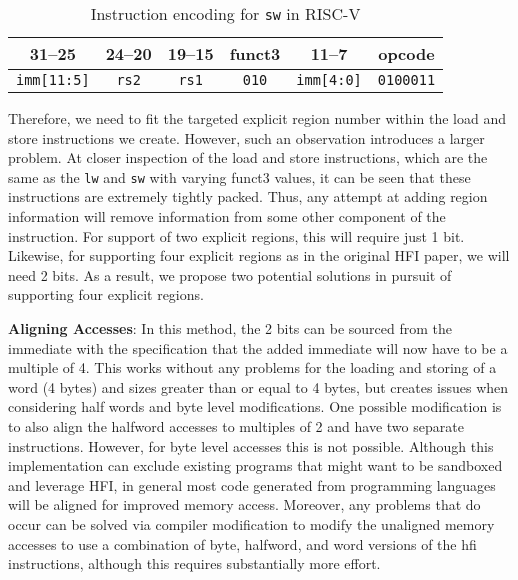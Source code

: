 \documentclass[conference,compsoc]{IEEEtran}
\begin{document}
  \begin{table}[H]
  \centering
  \caption{Instruction encoding for \texttt{sw} in RISC-V}
  {\fontsize{6.5}{7.5}\selectfont
  \begin{tabular}{|c|c|c|c|c|c|}
  \hline
  \textbf{31--25} & \textbf{24--20} & \textbf{19--15} & \textbf{funct3} & \textbf{11--7} & \textbf{opcode} \\
  \hline
  \texttt{imm[11:5]} & \texttt{rs2} & \texttt{rs1} & \texttt{010} & \texttt{imm[4:0]} & \texttt{0100011} \\
  \hline
  \end{tabular} 
  }
  \label{tab:sw-encoding}
  \end{table}

Therefore, we need to fit the targeted explicit region number within the load and store instructions we create.
However, such an observation introduces a larger problem. 
At closer inspection of the load and store instructions, which are the same as the \texttt{lw} and \texttt{sw} with varying funct3 values, it can be seen that these instructions are extremely tightly packed.
Thus, any attempt at adding region information will remove information from some other component of the instruction.
For support of two explicit regions, this will require just 1 bit. Likewise, for supporting four explicit regions as in the original HFI \cite{HFI} paper, we will need 2 bits. 
As a result, we propose two potential solutions in pursuit of supporting four explicit regions.

\textbf{Aligning Accesses}: 
In this method, the 2 bits can be sourced from the immediate with the specification that the added immediate will now have to be a multiple of 4. 
This works without any problems for the loading and storing of a word (4 bytes) and sizes greater than or equal to 4 bytes, but creates issues when considering half words and byte level modifications.
One possible modification is to also align the halfword accesses to multiples of 2 and have two separate instructions. However, for byte level accesses this is not possible.
Although this implementation can exclude existing programs that might want to be sandboxed and leverage HFI, in general most code generated from programming languages will be aligned for improved memory access.
Moreover, any problems that do occur can be solved via compiler modification to modify the unaligned memory accesses to use a combination of byte, halfword, and word versions of the hfi instructions, although this requires substantially more effort.
\end{document}
